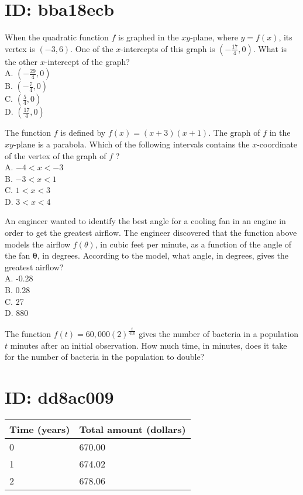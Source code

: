 \section*{ID: bba18ecb}
When the quadratic function $f$ is graphed in the $x y$-plane, where $y=f(x)$, its vertex is $(-3,6)$. One of the $x$-intercepts of this graph is $\left(-\frac{17}{4}, 0\right)$. What is the other $x$-intercept of the graph?\\
A. $\left(-\frac{29}{4}, 0\right)$\\
B. $\left(-\frac{7}{4}, 0\right)$\\
C. $\left(\frac{5}{4}, 0\right)$\\
D. $\left(\frac{17}{4}, 0\right)$

The function $f$ is defined by $f(x)=(x+3)(x+1)$. The graph of $f$ in the $x y$-plane is a parabola. Which of the following intervals contains the $x$-coordinate of the vertex of the graph of $f$ ?\\
A. $-4<x<-3$\\
B. $-3<x<1$\\
C. $1<x<3$\\
D. $3<x<4$

An engineer wanted to identify the best angle for a cooling fan in an engine in order to get the greatest airflow. The engineer discovered that the function above models the airflow $f(\theta)$, in cubic feet per minute, as a function of the angle of the fan $\boldsymbol{\theta}$, in degrees. According to the model, what angle, in degrees, gives the greatest airflow?\\
A. -0.28\\
B. 0.28\\
C. 27\\
D. 880

The function $f(t)=60,000(2)^{\frac{t}{410}}$ gives the number of bacteria in a population $t$ minutes after an initial observation. How much time, in minutes, does it take for the number of bacteria in the population to double?

\section*{ID: dd8ac009}
\begin{center}
\begin{tabular}{|l|l|}
\hline
Time (years) & Total amount (dollars) \\
\hline
0 & 670.00 \\
\hline
1 & 674.02 \\
\hline
2 & 678.06 \\
\hline
\end{tabular}
\end{center}

